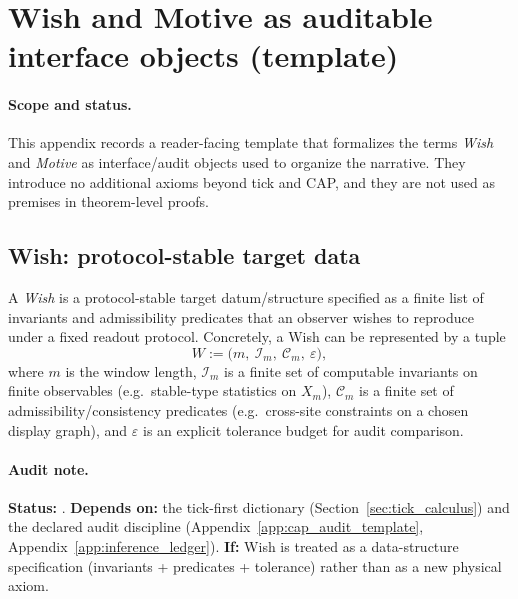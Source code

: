 \section{Wish and Motive as auditable interface objects (template)}\label{app:wish_motive_definitions}

\paragraph{Scope and status.}
\AuditTag This appendix records a reader-facing template that formalizes the terms \emph{Wish} and \emph{Motive} as interface/audit objects used to organize the narrative.
They introduce no additional axioms beyond tick and CAP, and they are not used as premises in theorem-level proofs.

\subsection{Wish: protocol-stable target data}\label{subsec:wish_protocol_stable_data}

\begin{definition}\label{def:wish_protocol_stable_data}
\InterfaceTag A \emph{Wish} is a protocol-stable target datum/structure specified as a finite list of invariants and admissibility predicates that an observer wishes to reproduce under a fixed readout protocol.
Concretely, a Wish can be represented by a tuple
\[
W := \bigl(m,\ \mathcal{I}_m,\ \mathcal{C}_m,\ \varepsilon\bigr),
\]
where $m$ is the window length, $\mathcal{I}_m$ is a finite set of computable invariants on finite observables (e.g.\ stable-type statistics on $X_m$), $\mathcal{C}_m$ is a finite set of admissibility/consistency predicates (e.g.\ cross-site constraints on a chosen display graph), and $\varepsilon$ is an explicit tolerance budget for audit comparison.
\end{definition}

\paragraph{Audit note.}
\AuditTag \textbf{Status:} \InterfaceTag.
\textbf{Depends on:} the tick-first dictionary (Section~\ref{sec:tick_calculus}) and the declared audit discipline (Appendix~\ref{app:cap_audit_template}, Appendix~\ref{app:inference_ledger}).
\textbf{If:} Wish is treated as a data-structure specification (invariants + predicates + tolerance) rather than as a new physical axiom.

